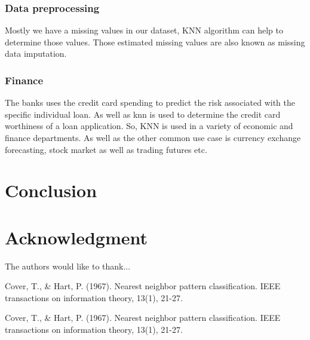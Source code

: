 \documentclass[conference]{IEEEtran}
\begin{document}
\subsubsection{Data preprocessing}
Mostly we have a missing values in our dataset, KNN algorithm can help to determine those values. Those estimated missing values are also known as missing data imputation. 

\subsubsection{Finance}
The banks uses the credit card spending to predict the risk associated with the specific individual loan. As well as knn is used to determine the credit card worthiness of a loan application. So, KNN is used in a variety of economic and finance departments. As well as the other common use case is currency exchange forecasting, stock market as well as trading futures etc.  



\section{Conclusion}




\section*{Acknowledgment}


The authors would like to thank...







%
%
%
\begin{thebibliography}{1}

Cover, T., \& Hart, P. (1967). Nearest neighbor pattern classification. IEEE transactions on information theory, 13(1), 21-27.

Cover, T., \& Hart, P. (1967). Nearest neighbor pattern classification. IEEE transactions on information theory, 13(1), 21-27.


\end{thebibliography}




\end{document}
